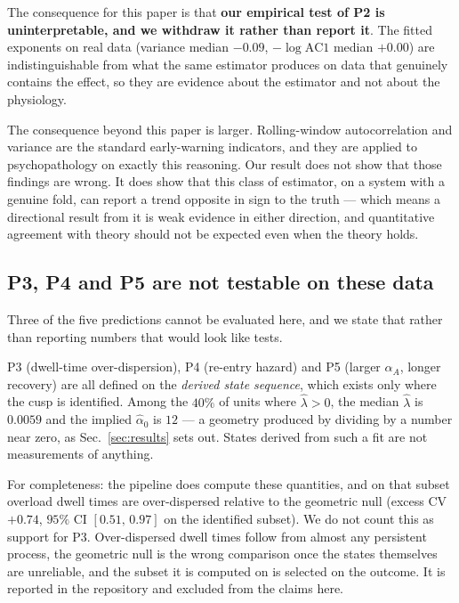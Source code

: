 \documentclass[conference]{IEEEtran}
\begin{document}
The consequence for this paper is that \textbf{our empirical test of P2 is
uninterpretable, and we withdraw it rather than report it}. The fitted
exponents on real data (variance median $-0.09$, $-\log\mathrm{AC1}$ median
$+0.00$) are indistinguishable from what the same estimator produces on data
that genuinely contains the effect, so they are evidence about the estimator
and not about the physiology.

The consequence beyond this paper is larger. Rolling-window autocorrelation and
variance are the standard early-warning indicators, and they are applied to
psychopathology
\cite{leemput2014,helmich2021,wichers2020,smit2025} on exactly this reasoning. Our
result does not show that those findings are wrong. It does show that this
class of estimator, on a system with a genuine fold, can report a trend
opposite in sign to the truth --- which means a directional result from it is
weak evidence in either direction, and quantitative agreement with theory
should not be expected even when the theory holds.

\subsection{P3, P4 and P5 are not testable on these data}
\label{sec:untestable}

Three of the five predictions cannot be evaluated here, and we state that
rather than reporting numbers that would look like tests.

P3 (dwell-time over-dispersion), P4 (re-entry hazard) and P5 (larger
$\alpha_A$, longer recovery) are all defined on the \emph{derived state
sequence}, which exists only where the cusp is identified. Among the $40\%$
of units where $\hat\lambda>0$, the median $\hat\lambda$ is $0.0059$ and the
implied $\hat\alpha_0$ is $12$ --- a geometry produced by dividing by a number
near zero, as Sec.~\ref{sec:results} sets out. States derived from such a fit
are not measurements of anything.

For completeness: the pipeline does compute these quantities, and on that
subset overload dwell times are over-dispersed relative to the geometric null
(excess CV $+0.74$, $95\%$ CI $[0.51,\,0.97]$ on the identified subset). We do not count this as support
for P3. Over-dispersed dwell times follow from almost any persistent process,
the geometric null is the wrong comparison once the states themselves are
unreliable, and the subset it is computed on is selected on the outcome. It is
reported in the repository and excluded from the claims here.
\end{document}

